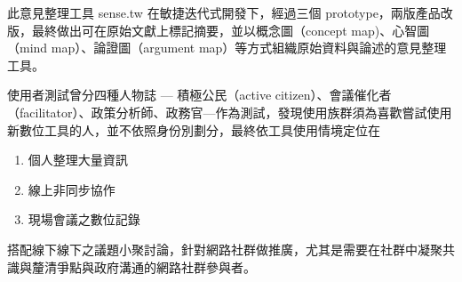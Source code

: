\documentclass[12pt,a4paper]{article}
\begin{document}
此意見整理工具 sense.tw 在敏捷迭代式開發下，經過三個 prototype，兩版產品改版，最終做出可在原始文獻上標記摘要，並以概念圖（concept map)、心智圖（mind map）、論證圖（argument map）等方式組織原始資料與論述的意見整理工具。

使用者測試曾分四種人物誌 — 積極公民（active citizen）、會議催化者（facilitator）、政策分析師、政務官—作為測試，發現使用族群須為喜歡嘗試使用新數位工具的人，並不依照身份別劃分，最終依工具使用情境定位在
\begin{enumerate}
\item 個人整理大量資訊
\item 線上非同步協作
\item 現場會議之數位記錄
\end{enumerate}

搭配線下線下之議題小聚討論，針對網路社群做推廣，尤其是需要在社群中凝聚共識與釐清爭點與政府溝通的網路社群參與者。
\end{document}
